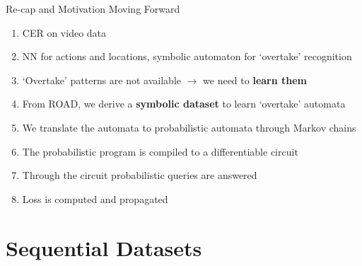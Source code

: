 \documentclass[10pt, aspectratio=169]{beamer}
\begin{document}
\begin{frame}{Re-cap and Motivation Moving Forward}
       \begin{enumerate}
        \setlength{\itemsep}{10pt}
        \item CER on video data
        \item NN for actions and locations, symbolic automaton for `overtake' recognition
        \item `Overtake' patterns are not available $\rightarrow$ we need to \textbf{learn them}
        \item From ROAD, we derive a \textbf{symbolic dataset} to learn `overtake' automata
        \item We translate the automata to probabilistic automata through Markov chains
        \item The probabilistic program is compiled to a differentiable circuit 
        \item Through the circuit probabilistic queries are answered
        \item Loss is computed and propagated
    \end{enumerate}
\end{frame}


\section{Sequential Datasets}
{
    \begin{frame}
        \sectionpage%
    \end{frame}
}
\end{document}
